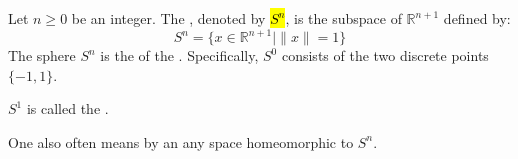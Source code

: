 \begin{definition} \label{definition:n_dimensional_unit_sphere}
Let $n \ge 0$ be an integer.
The , denoted by \hl{$S^n$}, is the subspace of $\mathbb{R}^{n+1}$ defined by:
$$S^n = \{x \in \mathbb{R}^{n+1} \mid \|x\| = 1\}$$
The sphere $S^n$ is the  of the . Specifically, $S^0$ consists of the two discrete points $\{-1, 1\}$.

$S^1$ is called the .

One also often means by an  any space homeomorphic to $S^n$.
\end{definition}